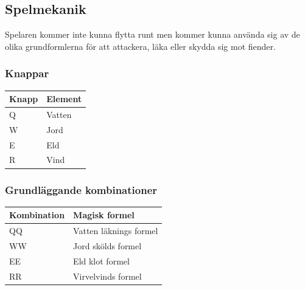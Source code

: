 \documentclass[12pt]{TDP005mall}
\begin{document}
\clearpage

\subsection{Spelmekanik}
Spelaren kommer inte kunna flytta runt men kommer kunna använda sig av de olika grundformlerna för att attackera, läka eller skydda sig mot fiender.

\subsubsection{Knappar}
\begin{table}[H]
\begin{tabular}{|l|l|}
\hline
\textbf{Knapp} & \textbf{Element} \\ \hline
Q              & Vatten           \\ \hline
W              & Jord             \\ \hline
E              & Eld              \\ \hline
R              & Vind             \\ \hline
\end{tabular}
\end{table}

\subsubsection{Grundläggande kombinationer}
\begin{table}[H]
\begin{tabular}{|l|l|}
\hline
\textbf{Kombination} & \textbf{Magisk formel} \\ \hline
QQ                   & Vatten läknings formel \\ \hline
WW                   & Jord skölds formel     \\ \hline
EE                   & Eld klot formel        \\ \hline
RR                   & Virvelvinds formel     \\ \hline
\end{tabular}
\end{table}
\end{document}
